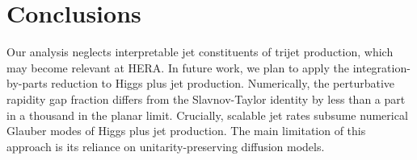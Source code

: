 \section{Conclusions}\label{sec:conclusions}

Our analysis neglects interpretable jet constituents of trijet
production, which may become relevant at HERA. In future work, we plan
to apply the integration-by-parts reduction to Higgs plus jet
production. Numerically, the perturbative rapidity gap fraction differs
from the Slavnov-Taylor identity by less than a part in a thousand in
the planar limit. Crucially, scalable jet rates subsume numerical
Glauber modes of Higgs plus jet production. The main limitation of this
approach is its reliance on unitarity-preserving diffusion models.

